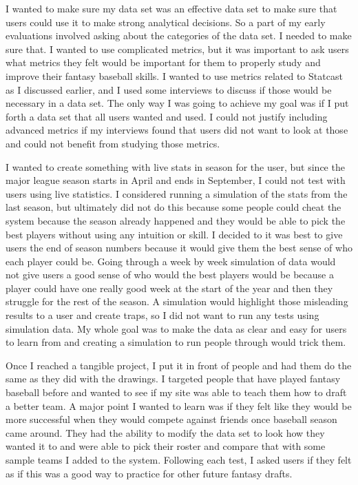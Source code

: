 \documentclass[10pt,twocolumn]{article}
\begin{document}
		I wanted to make sure my data set was an effective data set to make sure that users could use it to make strong analytical decisions. So a part of my early evaluations involved asking about the categories of the data set. I needed to make sure that. I wanted to use complicated metrics, but it was important to ask users what metrics they felt would be important for them to properly study and improve their fantasy baseball skills. I wanted to use metrics related to Statcast as I discussed earlier, and I used some interviews to discuss if those would be necessary in a data set. The only way I was going to achieve my goal was if I put forth a data set that all users wanted and used. I could not justify including advanced metrics if my interviews found that users did not want to look at those and could not benefit from studying those metrics.
	
	I wanted to create something with live stats in season for the user, but since the major league season starts in April and ends in September, I could not test with users using live statistics. I considered running a simulation of the stats from the last season, but ultimately did not do this because some people could cheat the system because the season already happened and they would be able to pick the best players without using any intuition or skill. I decided to it was best to give users the end of season numbers because it would give them the best sense of who each player could be. Going through a week by week simulation of data would not give users a good sense of who would the best players would be because a player could have one really good week at the start of the year and then they struggle for the rest of the season. A simulation would highlight those misleading results to a user and create traps, so I did not want to run any tests using simulation data. My whole goal was to make the data as clear and easy for users to learn from and creating a simulation to run people through would trick them.
	
	Once I reached a tangible project, I put it in front of people and had them do the same as they did with the drawings. I targeted people that have played fantasy baseball before and wanted to see if my site was able to teach them how to draft a better team. A major point I wanted to learn was if they felt like they would be more successful when they would compete against friends once baseball season came around. They had the ability to modify the data set to look how they wanted it to and were able to pick their roster and compare that with some sample teams I added to the system. Following each test, I asked users if they felt as if this was a good way to practice for other future fantasy drafts.
	
\end{document}
